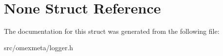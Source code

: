 \hypertarget{structNone}{}\section{None Struct Reference}
\label{structNone}


The documentation for this struct was generated from the following file\+:\begin{DoxyCompactItemize}
\item 
src/omexmeta/logger.\+h\end{DoxyCompactItemize}
